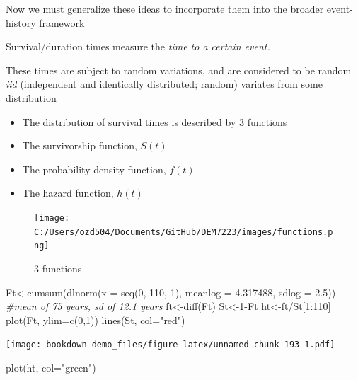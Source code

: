 \documentclass[
]{article}
\newenvironment{Shaded}{\begin{snugshade}}{\end{snugshade}}
\newcommand{\AttributeTok}[1]{\textcolor[rgb]{0.77,0.63,0.00}{#1}}
\newcommand{\CommentTok}[1]{\textcolor[rgb]{0.56,0.35,0.01}{\textit{#1}}}
\newcommand{\DecValTok}[1]{\textcolor[rgb]{0.00,0.00,0.81}{#1}}
\newcommand{\FloatTok}[1]{\textcolor[rgb]{0.00,0.00,0.81}{#1}}
\newcommand{\FunctionTok}[1]{\textcolor[rgb]{0.00,0.00,0.00}{#1}}
\newcommand{\NormalTok}[1]{#1}
\newcommand{\OtherTok}[1]{\textcolor[rgb]{0.56,0.35,0.01}{#1}}
\newcommand{\SpecialCharTok}[1]{\textcolor[rgb]{0.00,0.00,0.00}{#1}}
\newcommand{\StringTok}[1]{\textcolor[rgb]{0.31,0.60,0.02}{#1}}
\providecommand{\tightlist}{%
  \setlength{\itemsep}{0pt}\setlength{\parskip}{0pt}}
\begin{document}
Now we must generalize these ideas to incorporate them into the broader event-history framework

Survival/duration times measure the \emph{time to a certain event.}

These times are subject to random variations, and are considered to be random \emph{iid} (independent and identically distributed; random) variates from some distribution

\begin{itemize}
\tightlist
\item
  The distribution of survival times is described by 3 functions
\item
  The survivorship function, \(S(t)\)
\item
  The probability density function, \(f(t)\)
\item
  The hazard function, \(h(t)\)
\end{itemize}

\begin{figure}
\centering
\texttt{[image: C:/Users/ozd504/Documents/GitHub/DEM7223/images/functions.png]}
\caption{3 functions}
\end{figure}

\begin{Shaded}
\begin{Highlighting}[]
\NormalTok{Ft}\OtherTok{\textless{}{-}}\FunctionTok{cumsum}\NormalTok{(}\FunctionTok{dlnorm}\NormalTok{(}\AttributeTok{x =} \FunctionTok{seq}\NormalTok{(}\DecValTok{0}\NormalTok{, }\DecValTok{110}\NormalTok{, }\DecValTok{1}\NormalTok{), }\AttributeTok{meanlog =} \FloatTok{4.317488}\NormalTok{, }\AttributeTok{sdlog =} \FloatTok{2.5}\NormalTok{)) }\CommentTok{\#mean of 75 years, sd of 12.1 years}
\NormalTok{ft}\OtherTok{\textless{}{-}}\FunctionTok{diff}\NormalTok{(Ft)}
\NormalTok{St}\OtherTok{\textless{}{-}}\DecValTok{1}\SpecialCharTok{{-}}\NormalTok{Ft}
\NormalTok{ht}\OtherTok{\textless{}{-}}\NormalTok{ft}\SpecialCharTok{/}\NormalTok{St[}\DecValTok{1}\SpecialCharTok{:}\DecValTok{110}\NormalTok{]}
\FunctionTok{plot}\NormalTok{(Ft, }\AttributeTok{ylim=}\FunctionTok{c}\NormalTok{(}\DecValTok{0}\NormalTok{,}\DecValTok{1}\NormalTok{))}
\FunctionTok{lines}\NormalTok{(St, }\AttributeTok{col=}\StringTok{"red"}\NormalTok{)}
\end{Highlighting}
\end{Shaded}

\texttt{[image: bookdown-demo\_files/figure-latex/unnamed-chunk-193-1.pdf]}

\begin{Shaded}
\begin{Highlighting}[]
\FunctionTok{plot}\NormalTok{(ht, }\AttributeTok{col=}\StringTok{"green"}\NormalTok{)}
\end{Highlighting}
\end{Shaded}
\end{document}
